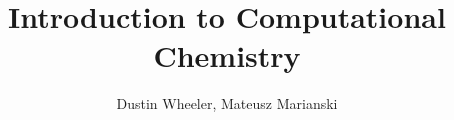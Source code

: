 \documentclass[nobib,nofonts,nols,nohyper]{tufte-handout}
\begin{document}
%
%


\title{Introduction to Computational Chemistry}

\author{Dustin Wheeler, Mateusz Marianski}
\end{document}
